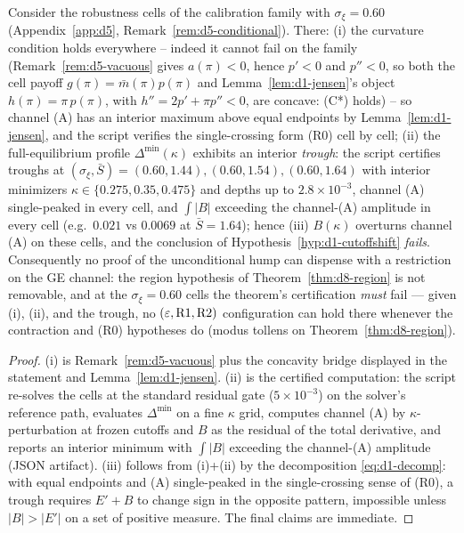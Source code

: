 \begin{proposition}
\label{prop:d8-counter}
Consider the robustness cells of the calibration family with $\sigma_\xi=0.60$ (Appendix~\ref{app:d5}, Remark~\ref{rem:d5-conditional}). There: (i) the curvature condition holds everywhere -- indeed it cannot fail on the family (Remark~\ref{rem:d5-vacuous} gives $a(\pi)<0$, hence $p'<0$ and $p''<0$, so both the cell payoff $g(\pi)=\bar m(\pi)p(\pi)$ and Lemma~\ref{lem:d1-jensen}'s object $h(\pi)=\pi\,p(\pi)$, with $h''=2p'+\pi p''<0$, are concave: \textup{(C*)} holds) -- so channel (A) has an interior maximum above equal endpoints by Lemma~\ref{lem:d1-jensen}, and the script verifies the single-crossing form \textup{(R0)} cell by cell; (ii) the full-equilibrium profile $\Delta^{\min}(\kappa)$ exhibits an interior \emph{trough}: the script certifies troughs at $(\sigma_\xi,\bar S)=(0.60,1.44),(0.60,1.54),(0.60,1.64)$ with interior minimizers $\kappa\in\{0.275,0.35,0.475\}$ and depths up to $2.8\times10^{-3}$, channel (A) single-peaked in every cell, and $\int|B|$ exceeding the channel-(A) amplitude in every cell (e.g.\ $0.021$ vs $0.0069$ at $\bar S=1.64$); hence (iii) $B(\kappa)$ overturns channel (A) on these cells, and the conclusion of Hypothesis~\ref{hyp:d1-cutoffshift} \emph{fails}. Consequently no proof of the unconditional hump can dispense with a restriction on the GE channel: the region hypothesis of Theorem~\ref{thm:d8-region} is not removable, and at the $\sigma_\xi=0.60$ cells the theorem's certification \emph{must} fail --- given (i), (ii), and the trough, no $(\varepsilon,\textup{R1},\textup{R2})$ configuration can hold there whenever the contraction and \textup{(R0)} hypotheses do (modus tollens on Theorem~\ref{thm:d8-region}).
\end{proposition}

\begin{proof}
(i) is Remark~\ref{rem:d5-vacuous} plus the concavity bridge displayed in the statement and Lemma~\ref{lem:d1-jensen}. (ii) is the certified computation: the script re-solves the cells at the standard residual gate ($5\times10^{-3}$) on the solver's reference path, evaluates $\Delta^{\min}$ on a fine $\kappa$ grid, computes channel (A) by $\kappa$-perturbation at frozen cutoffs and $B$ as the residual of the total derivative, and reports an interior minimum with $\int|B|$ exceeding the channel-(A) amplitude (JSON artifact). (iii) follows from (i)+(ii) by the decomposition \eqref{eq:d1-decomp}: with equal endpoints and (A) single-peaked in the single-crossing sense of \textup{(R0)}, a trough requires $E'+B$ to change sign in the opposite pattern, impossible unless $|B|>|E'|$ on a set of positive measure. The final claims are immediate.
\end{proof}

